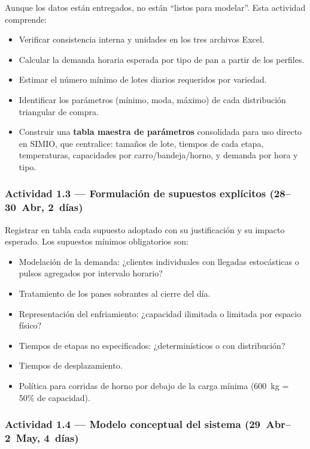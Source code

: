 \documentclass[12pt]{article}
\begin{document}
Aunque los datos están entregados, no están ``listos para modelar''. Esta actividad comprende:
\begin{itemize}
  \item Verificar consistencia interna y unidades en los tres archivos Excel.
  \item Calcular la demanda horaria esperada por tipo de pan a partir de los perfiles.
  \item Estimar el número mínimo de lotes diarios requeridos por variedad.
  \item Identificar los parámetros (mínimo, moda, máximo) de cada distribución triangular de compra.
  \item Construir una \textbf{tabla maestra de parámetros} consolidada para uso directo en SIMIO, que centralice: tamaños de lote, tiempos de cada etapa, temperaturas, capacidades por carro/bandeja/horno, y demanda por hora y tipo.
\end{itemize}

\subsubsection{Actividad 1.3 --- Formulación de supuestos explícitos \quad(28--30~Abr, 2~días)}

Registrar en tabla cada supuesto adoptado con su justificación y su impacto esperado. Los supuestos mínimos obligatorios son:

\begin{itemize}
  \item Modelación de la demanda: ¿clientes individuales con llegadas estocásticas o pulsos agregados por intervalo horario?
  \item Tratamiento de los panes sobrantes al cierre del día.
  \item Representación del enfriamiento: ¿capacidad ilimitada o limitada por espacio físico?
  \item Tiempos de etapas no especificados: ¿determinísticos o con distribución?
  \item Tiempos de desplazamiento.
  \item Política para corridas de horno por debajo de la carga mínima (600~kg = 50\% de capacidad).
\end{itemize}

\subsubsection{Actividad 1.4 --- Modelo conceptual del sistema \quad(29~Abr--2~May, 4~días)}
\end{document}
